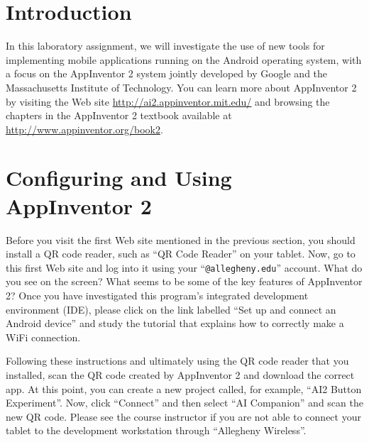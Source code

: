 


\usepackage[compact]{titlesec}



\vspace*{-.1in}
\section*{Introduction}

In this laboratory assignment, we will investigate the use of new tools for implementing mobile applications running on
the Android operating system, with a focus on the AppInventor 2 system jointly developed by Google and the Massachusetts
Institute of Technology.  You can learn more about AppInventor 2 by visiting the Web site
\url{http://ai2.appinventor.mit.edu/} and browsing the chapters in the AppInventor 2 textbook available at
\url{http://www.appinventor.org/book2}.

\section*{Configuring and Using AppInventor 2}

Before you visit the first Web site mentioned in the previous section, you should install a QR code reader, such as ``QR
Code Reader'' on your tablet. Now, go to this first Web site and log into it using your ``{\tt @allegheny.edu}''
account. What do you see on the screen? What seems to be some of the key features of AppInventor 2? Once you have
investigated this program's integrated development environment (IDE), please click on the link labelled ``Set up and
connect an Android device'' and study the tutorial that explains how to correctly make a WiFi connection. 

Following these instructions and ultimately using the QR code reader that you installed, scan the QR code created by
AppInventor 2 and download the correct app. At this point, you can create a new project called, for
example, ``AI2 Button Experiment''. Now, click ``Connect'' and then select ``AI Companion'' and scan the new QR code.
Please see the course instructor if you are not able to connect your tablet
to the development workstation through ``Allegheny Wireless''. 


